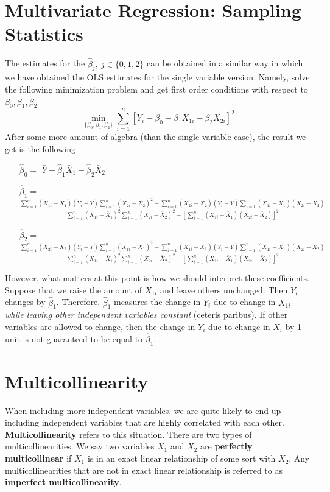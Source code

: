 

\section{Multivariate Regression: Sampling Statistics}
The estimates for the $\hat{\beta}_j, \ j\in\{0,1,2\}$ can be obtained in a similar way in which we have obtained the OLS estimates for the single variable version. Namely, solve the following minimization problem and get first order conditions with respect to $\beta_0, \beta_1, \beta_2$
\[
\min_{\{\beta_0,\beta_1,\beta_2\}} \sum_{i=1}^n[Y_i-\beta_0 - \beta_1X_{1i}-\beta_2X_{2i}]^2
\]
After some more amount of algebra (than the single variable case), the result we get is the following
\begin{itemize}
\item[$\hat{\beta}_0=$] $\bar{Y}-\hat{\beta}_1\bar{X}_1-\hat{\beta}_2\bar{X}_2$
\item[$\hat{\beta}_1=$] $\frac{\sum_{i=1}^n (X_{1i}-\bar{X}_1)(Y_{i}-\bar{Y})\sum_{i=1}^n(X_{2i}-\bar{X}_2)^2-\sum_{i=1}^n (X_{2i}-\bar{X}_2)(Y_{i}-\bar{Y})\sum_{i=1}^n(X_{1i}-\bar{X}_1)(X_{2i}-\bar{X}_2)}{\sum_{i=1}^n (X_{1i}-\bar{X}_1)^2\sum_{i=1}^n (X_{2i}-\bar{X}_2)^2-[\sum_{i=1}^n (X_{1i}-\bar{X}_1)(X_{2i}-\bar{X}_2)]^2}$
\item[$\hat{\beta}_2=$] $\frac{\sum_{i=1}^n (X_{2i}-\bar{X}_2)(Y_{i}-\bar{Y})\sum_{i=1}^n(X_{1i}-\bar{X}_1)^2-\sum_{i=1}^n (X_{1i}-\bar{X}_1)(Y_{i}-\bar{Y})\sum_{i=1}^n(X_{1i}-\bar{X}_1)(X_{2i}-\bar{X}_2)}{\sum_{i=1}^n (X_{1i}-\bar{X}_1)^2\sum_{i=1}^n (X_{2i}-\bar{X}_2)^2-[\sum_{i=1}^n (X_{1i}-\bar{X}_1)(X_{2i}-\bar{X}_2)]^2}$
\end{itemize} \par\medskip
However, what matters at this point is how we should interpret these coefficients. Suppose that we raise the amount of $X_{1i}$ and leave others unchanged. Then $Y_i$ changes by $\hat{\beta}_1$. Therefore, $\hat{\beta}_1$ measures the change in $Y_i$ due to change in $X_{1i}$ \emph{while leaving other independent variables constant} (ceteris paribus). If other variables are allowed to change, then the change in $Y_i$ due to change in $X_i$ by 1 unit is not guaranteed to be equal to $\hat{\beta}_1$.

\section{Multicollinearity}
When including more independent variables, we are quite likely to end up including independent variables that are highly correlated with each other. \textbf{Multicollinearity} refers to this situation. There are two types of multicollinearities. We say two variables $X_1$ and $X_2$ are \textbf{perfectly multicollinear} if $X_1$ is in an exact linear relationship of some sort with $X_2$. Any multicollinearities that are not in exact linear relationship is referred to as \textbf{imperfect multicollinearity}. \par\medskip

